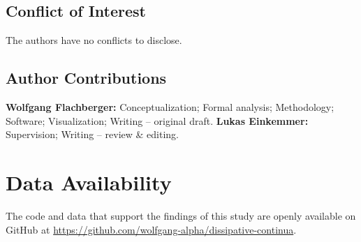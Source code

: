 \documentclass[aip,pof,reprint,amsmath,amssymb,longbibliography]{revtex4-2}
\begin{document}
\subsection*{Conflict of Interest}
The authors have no conflicts to disclose.

\subsection*{Author Contributions}
\textbf{Wolfgang Flachberger:} Conceptualization; Formal analysis; Methodology; Software; Visualization; Writing -- original draft.
\textbf{Lukas Einkemmer:} Supervision; Writing -- review \& editing.

\section*{Data Availability}
The code and data that support the findings of this study are openly available on GitHub at \url{https://github.com/wolfgang-alpha/dissipative-continua}.

\makeatletter{}\makeatother

\end{document}
